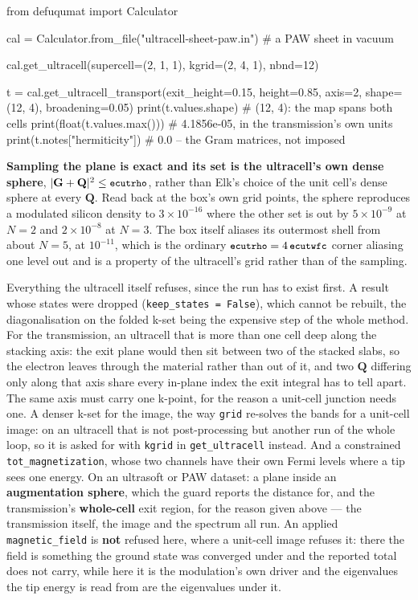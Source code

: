 \documentclass[11pt,a4paper]{article}
\newcommand{\code}[1]{\texttt{\small #1}}
\begin{document}
\begin{pycode}
from defuqumat import Calculator

cal = Calculator.from_file("ultracell-sheet-paw.in")   # a PAW sheet in vacuum

cal.get_ultracell(supercell=(2, 1, 1), kgrid=(2, 4, 1), nbnd=12)

t = cal.get_ultracell_transport(exit_height=0.15, height=0.85, axis=2,
                                shape=(12, 4), broadening=0.05)
print(t.values.shape)            # (12, 4): the map spans both cells
print(float(t.values.max()))     # 4.1856e-05, in the transmission's own units
print(t.notes["hermiticity"])    # 0.0 -- the Gram matrices, not imposed
\end{pycode}

\textbf{Sampling the plane is exact and its set is the ultracell's own dense
sphere}, $|\mathbf G + \mathbf Q|^2 \le \code{ecutrho}$, rather than Elk's
choice of the unit cell's dense sphere at every $\mathbf Q$. Read back at the
box's own grid points, the sphere reproduces a modulated silicon density to
$3\times10^{-16}$ where the other set is out by $5\times10^{-9}$ at $N = 2$ and
$2\times10^{-8}$ at $N = 3$. The box itself aliases its outermost shell from
about $N = 5$, at $10^{-11}$, which is the ordinary $\code{ecutrho} = 4\,
\code{ecutwfc}$ corner aliasing one level out and is a property of the
ultracell's grid rather than of the sampling.

\begin{refuses}
Everything the ultracell itself refuses, since the run has to exist first. A
result whose states were dropped (\code{keep\_states = False}), which cannot be
rebuilt, the diagonalisation on the folded k-set being the expensive step of the
whole method. For the transmission, an ultracell that is more than one cell deep
along the stacking axis: the exit plane would then sit between two of the
stacked slabs, so the electron leaves through the material rather than out of
it, and two $\mathbf Q$ differing only along that axis share every in-plane
index the exit integral has to tell apart. The same axis must carry one k-point,
for the reason a unit-cell junction needs one. A denser k-set for the image, the
way \code{grid} re-solves the bands for a unit-cell image: on an ultracell that
is not post-processing but another run of the whole loop, so it is asked for
with \code{kgrid} in \code{get\_ultracell} instead. And a constrained
\code{tot\_magnetization}, whose two channels have their own Fermi levels where
a tip sees one energy. On an ultrasoft or PAW dataset: a plane inside an
\textbf{augmentation sphere}, which the guard reports the distance for, and the
transmission's \textbf{whole-cell} exit region, for the reason given above ---
the transmission itself, the image and the spectrum all run. An applied \code{magnetic\_field} is \textbf{not} refused
here, where a unit-cell image refuses it: there the field is something the
ground state was converged under and the reported total does not carry, while
here it is the modulation's own driver and the eigenvalues the tip energy is
read from are the eigenvalues under it.
\end{refuses}
\end{document}
